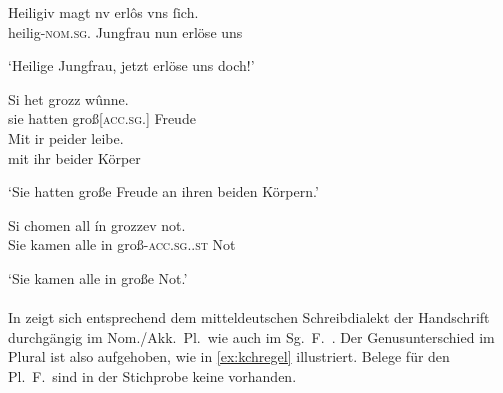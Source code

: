 \begin{exe}
\ex \label{ex:kcmsg}
	\begin{xlist}
	\ex \label{ex:kcmsg_1}
		\gll Heiligiv magt nv erlôs {vns ſich}. \\
			heilig-\textsc{nom.sg.\FemF} Jungfrau nun erlöse uns\footnotemark \\
		\begin{taggedline}{\parencites[\pno~84\ra, 21]{kc:M}[vgl.][11027]{schroeder1895}}
		\trans `Heilige Jungfrau, jetzt erlöse uns doch!'
		\end{taggedline}

	\ex \label{ex:kcmsg_2}
		\gll Si het grozz wûnne. \\
			sie hatten groß[\textsc{acc.sg.\FemI}] Freude \\
	\sn \gll Mit ir peider leibe. \\
			mit ihr beider Körper \\
		\begin{taggedline}{\parencites%
			[\pno~10\ra, 20--21]{kc:M}[vgl.]%
			[\pno~7\rb, 18--19]{kc:H}%
			[\pno~5\va, 32--33]{kc:B1}%
			[\pno~6\vb, 30--31]{kc:VB}%
			[\pno~6\vb, 11--12]{kc:C1}%
			[\pno~8\ra, 12--13]{kc:K}%
			[1230--1231]{schroeder1895}%
		}
		\trans `Sie hatten große Freude an ihren beiden Körpern.'
		\end{taggedline}

	\ex \label{ex:kcmsg_3}
		\gll Si chomen all ín grozzev not. \\
			Sie kamen alle in groß-\textsc{acc.sg.\FemI.st} Not \\
		\begin{taggedline}{\parencites[\pno~40\va, 2]{kc:M}[vgl.][5384]{schroeder1895}}
		\trans `Sie kamen alle in große Not.'
		\end{taggedline}
	\end{xlist}
\end{exe}

\paragraph{\citet{kc:H}}
In \citet{kc:H} zeigt sich entsprechend dem mitteldeutschen Schreibdialekt der
Handschrift durch\-gängig  im Nom./Akk.\ Pl.\ wie auch im Sg.~F.\
\autocite[vgl.][181--184]{ksw2}. Der Genus\-unterschied im Plural ist also
aufgehoben, wie in \cref{ex:kchregel} illustriert. Belege für den Pl.~F.\
sind in der Stichprobe keine vorhanden.

